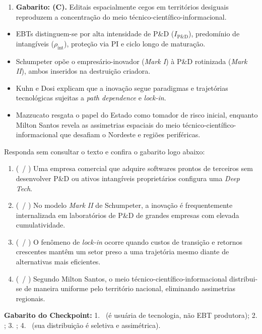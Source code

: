 \begin{boxGabarito}
\begin{enumerate}[leftmargin=1.6em, itemsep=4pt]
  \item \textbf{Gabarito: (C).} Editais espacialmente cegos em territórios desiguais reproduzem a concentração do meio técnico-científico-informacional.
\end{enumerate}
\end{boxGabarito}

\begin{boxResumo}
\begin{itemize}[leftmargin=1.4em, itemsep=2pt]
  \item EBTs distinguem-se por alta intensidade de P\&D ($I_{\text{P\&D}}$), predomínio de intangíveis ($\rho_{\text{int}}$), proteção via PI e ciclo longo de maturação.
  \item Schumpeter opõe o empresário-inovador (\textit{Mark I}) à P\&D rotinizada (\textit{Mark II}), ambos inseridos na destruição criadora.
  \item Kuhn e Dosi explicam que a inovação segue paradigmas e trajetórias tecnológicas sujeitas a \textit{path dependence} e \textit{lock-in}.
  \item Mazzucato resgata o papel do Estado como tomador de risco inicial, enquanto Milton Santos revela as assimetrias espaciais do meio técnico-científico-informacional que desafiam o Nordeste e regiões periféricas.
\end{itemize}
\end{boxResumo}

\begin{boxTeste}
Responda sem consultar o texto e confira o gabarito logo abaixo:
\begin{enumerate}[leftmargin=1.4em, itemsep=3pt]
  \item (\V\ / \F) Uma empresa comercial que adquire softwares prontos de terceiros sem desenvolver P\&D ou ativos intangíveis proprietários configura uma \textit{Deep Tech}.
  \item (\V\ / \F) No modelo \textit{Mark II} de Schumpeter, a inovação é frequentemente internalizada em laboratórios de P\&D de grandes empresas com elevada cumulatividade.
  \item (\V\ / \F) O fenômeno de \textit{lock-in} ocorre quando custos de transição e retornos crescentes mantêm um setor preso a uma trajetória mesmo diante de alternativas mais eficientes.
  \item (\V\ / \F) Segundo Milton Santos, o meio técnico-científico-informacional distribui-se de maneira uniforme pelo território nacional, eliminando assimetrias regionais.
\end{enumerate}
\vspace{4pt}
\textbf{Gabarito do Checkpoint:} 1. \F\ (é usuária de tecnologia, não EBT produtora); 2. \V; 3. \V; 4. \F\ (sua distribuição é seletiva e assimétrica).
\end{boxTeste}
